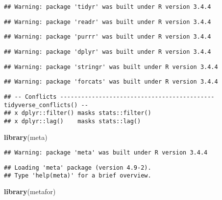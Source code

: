 \documentclass[]{article}
\newenvironment{Shaded}{\begin{snugshade}}{\end{snugshade}}
\newcommand{\KeywordTok}[1]{\textcolor[rgb]{0.13,0.29,0.53}{\textbf{#1}}}
\newcommand{\NormalTok}[1]{#1}
\begin{document}
\begin{verbatim}
## Warning: package 'tidyr' was built under R version 3.4.4
\end{verbatim}

\begin{verbatim}
## Warning: package 'readr' was built under R version 3.4.4
\end{verbatim}

\begin{verbatim}
## Warning: package 'purrr' was built under R version 3.4.4
\end{verbatim}

\begin{verbatim}
## Warning: package 'dplyr' was built under R version 3.4.4
\end{verbatim}

\begin{verbatim}
## Warning: package 'stringr' was built under R version 3.4.4
\end{verbatim}

\begin{verbatim}
## Warning: package 'forcats' was built under R version 3.4.4
\end{verbatim}

\begin{verbatim}
## -- Conflicts -------------------------------------------- tidyverse_conflicts() --
## x dplyr::filter() masks stats::filter()
## x dplyr::lag()    masks stats::lag()
\end{verbatim}

\begin{Shaded}
\begin{Highlighting}[]
\KeywordTok{library}\NormalTok{(meta)}
\end{Highlighting}
\end{Shaded}

\begin{verbatim}
## Warning: package 'meta' was built under R version 3.4.4
\end{verbatim}

\begin{verbatim}
## Loading 'meta' package (version 4.9-2).
## Type 'help(meta)' for a brief overview.
\end{verbatim}

\begin{Shaded}
\begin{Highlighting}[]
\KeywordTok{library}\NormalTok{(metafor)}
\end{Highlighting}
\end{Shaded}
\end{document}
